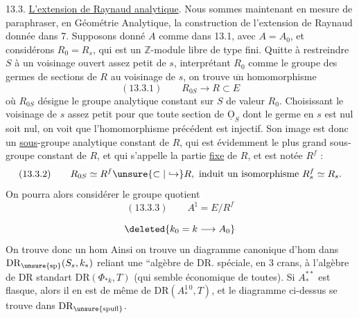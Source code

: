 13.3. \uline{L'extension de Raynaud analytique}. Nous sommes maintenant en mesure de paraphraser, en Géométrie Analytique, la construction de l'extension de Raynaud donnée dans 7. Supposons donné $A$ comme dans 13.1, avec $A=A_0$, et considérons $R_0=R_s$, qui est un $\mathbb Z$-module libre de type fini. Quitte à restreindre $S$ à un voisinage ouvert assez petit de $s$, interprétant $R_0$ comme le groupe des germes de sections de $R$ au voisinage de $s$, on trouve $\overline{\text{un}}$ homomorphisme
\[
(13.3.1)\qquad R_{0S}\longrightarrow R\subset E
\]
où $R_{0S}$ désigne le groupe analytique constant sur $S$ de valeur $R_0$. Choisissant le voisinage de $s$ assez petit pour que toute section de $\underline{\mathrm O}_S$ dont le germe en $s$ est nul soit nul, on voit que l'homomorphisme précédent est injectif. Son image est donc un \uline{sous}-groupe analytique constant de $R$, qui est évidemment le plus grand sous-groupe constant de $R$, et qui s'appelle la partie \uline{fixe} de $R$, et est notée $R^f$ :
\[
(13.3.2)\qquad R_{0S}\simeq R^f\unsure{\subset|\hookrightarrow}R,\ \text{induit un isomorphisme }R^f_s\simeq R_s.
\]
On pourra alors considérer le groupe quotient
\[
(13.3.3)\qquad A^{\natural}=E/R^f
\]

\[\deleted{k_0=k\longrightarrow A_0}\]
On trouve donc un hom
Ainsi on trouve un diagramme canonique d'hom dans $\mathrm{DR}_{\unsure{\mathrm{sp}}}(S_s,k_*)$
reliant une ``algèbre de DR. spéciale, en $3$ crans, à l'algèbre de DR standart $\mathrm{DR}(\Phi_{*k},T)$ (qui semble  économique de toutes). Si $A_*^{**}$ est  flasque, alors il en est de même de $\mathrm{DR}(A_*^{1\,0},T)$, et le diagramme ci-dessus se trouve dans $\mathrm{DR}_{\unsure{\mathrm{spufl}}}$.

